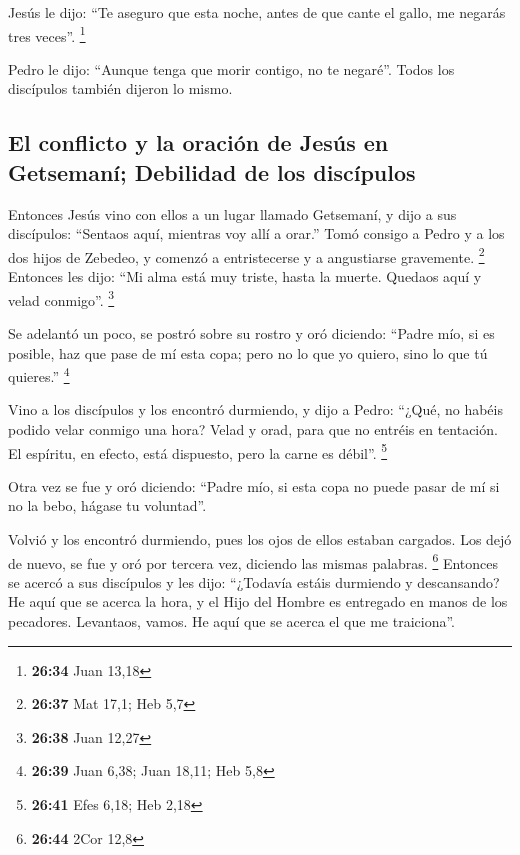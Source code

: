  Jesús le dijo: ``Te aseguro que esta noche, antes de que
cante el gallo, me negarás tres veces''. \footnote{\textbf{26:34} Juan
  13,18}

 Pedro le dijo: ``Aunque tenga que morir contigo, no te
negaré''. Todos los discípulos también dijeron lo mismo.

\hypertarget{el-conflicto-y-la-oraciuxf3n-de-jesuxfas-en-getsemanuxed-debilidad-de-los-discuxedpulos}{%
\subsection{El conflicto y la oración de Jesús en Getsemaní; Debilidad
de los
discípulos}\label{el-conflicto-y-la-oraciuxf3n-de-jesuxfas-en-getsemanuxed-debilidad-de-los-discuxedpulos}}

 Entonces Jesús vino con ellos a un lugar llamado
Getsemaní, y dijo a sus discípulos: ``Sentaos aquí, mientras voy allí a
orar.''  Tomó consigo a Pedro y a los dos hijos de
Zebedeo, y comenzó a entristecerse y a angustiarse gravemente.
\footnote{\textbf{26:37} Mat 17,1; Heb 5,7}  Entonces les
dijo: ``Mi alma está muy triste, hasta la muerte. Quedaos aquí y velad
conmigo''. \footnote{\textbf{26:38} Juan 12,27}

 Se adelantó un poco, se postró sobre su rostro y oró
diciendo: ``Padre mío, si es posible, haz que pase de mí esta copa; pero
no lo que yo quiero, sino lo que tú quieres.'' \footnote{\textbf{26:39}
  Juan 6,38; Juan 18,11; Heb 5,8}

 Vino a los discípulos y los encontró durmiendo, y dijo a
Pedro: ``¿Qué, no habéis podido velar conmigo una hora? 
Velad y orad, para que no entréis en tentación. El espíritu, en efecto,
está dispuesto, pero la carne es débil''. \footnote{\textbf{26:41} Efes
  6,18; Heb 2,18}

 Otra vez se fue y oró diciendo: ``Padre mío, si esta
copa no puede pasar de mí si no la bebo, hágase tu voluntad''.

 Volvió y los encontró durmiendo, pues los ojos de ellos
estaban cargados.  Los dejó de nuevo, se fue y oró por
tercera vez, diciendo las mismas palabras. \footnote{\textbf{26:44} 2Cor
  12,8}  Entonces se acercó a sus discípulos y les dijo:
``¿Todavía estáis durmiendo y descansando? He aquí que se acerca la
hora, y el Hijo del Hombre es entregado en manos de los pecadores.
 Levantaos, vamos. He aquí que se acerca el que me
traiciona''.

